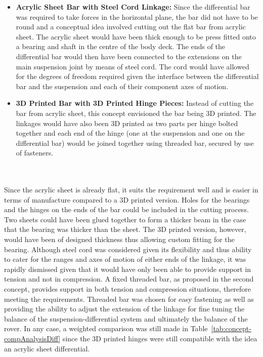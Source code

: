       \begin{itemize}
        \item \textbf{Acrylic Sheet Bar with Steel Cord Linkage:} Since the differential bar was required to take forces in the horizontal plane, the bar did not have to be round and a conceptual idea involved cutting out the flat bar from acrylic sheet. The acrylic sheet would have been thick enough to be press fitted onto a bearing and shaft in the centre of the body deck. The ends of the differential bar would then have been connected to the extensions on the main suspension joint by means of steel cord. The cord would have allowed for the degrees of freedom required given the interface between the differential bar and the suspension and each of their component axes of motion.
        
        \item \textbf{3D Printed Bar with 3D Printed Hinge Pieces:} Instead of cutting the bar from acrylic sheet, this concept envisioned the bar being 3D printed. The linkages would have also been 3D printed as two parts per hinge bolted together and each end of the hinge (one at the suspension and one on the differential bar) would be joined together using threaded bar, secured by use of fasteners.
      \end{itemize}
      
      \\\\
      Since the acrylic sheet is already flat, it suits the requirement well and is easier in terms of manufacture compared to a 3D printed version. Holes for the bearings and the hinges on the ends of the bar could be included in the cutting process. Two sheets could have been glued together to form a thicker beam in the case that the bearing was thicker than the sheet. The 3D printed version, however, would have been of designed thickness thus allowing custom fitting for the bearing. Although steel cord was considered given its flexibility and thus ability to cater for the ranges and axes of motion of either ends of the linkage, it was rapidly dismissed given that it would have only been able to provide support in tension and not in compression. A fixed threaded bar, as proposed in the second concept, provides support in both tension and compression situations, therefore meeting the requirements. Threaded bar was chosen for easy fastening as well as providing the ability to adjust the extension of the linkage for fine tuning the balance of the suspension-differential system and ultimately the balance of the rover. In any case, a weighted comparison was still made in Table~\ref{tab:concept-compAnalysisDiff} since the 3D printed hinges were still compatible with the idea an acrylic sheet differential.
      
